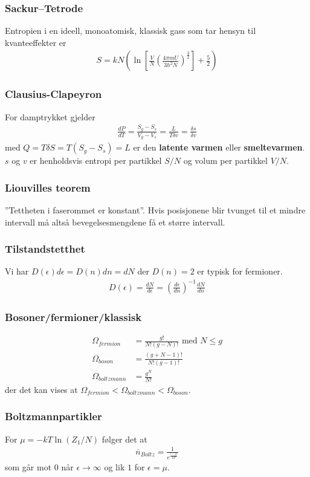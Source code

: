 \documentclass[a4paper, norsk, 10pt]{article}
\newcommand{\EQU}[1] { \begin{equation*} \begin{split}
#1  
\end{split} \end{equation*} }
\begin{document}
\begin{multicols*}{2}
\subsubsection*{Sackur–Tetrode}
Entropien i en ideell, monoatomisk, klassisk gass som tar hensyn til kvanteeffekter er
\EQU{
S = kN \left( \ln \left[ \frac{V}{N} \left(\frac{4 \pi m U}{3h^2 N}\right)^\frac{3}{2} \right] + \frac{5}{2} \right)
}

\subsubsection*{Clausius-Clapeyron}
For damptrykket gjelder
\EQU{
\frac{dP}{dT} = \frac{S_g-S_s}{V_g-V_s} = \frac{L}{T\delta v} = \frac{\delta s}{\delta v}
}
med $Q=T\delta S = T(S_g-S_s) = L$ er den \textbf{latente varmen} eller \textbf{smeltevarmen}. $s$ og $v$ er henholdsvis entropi per partikkel $S/N$ og volum per partikkel $V/N$.


\subsubsection*{Liouvilles teorem}
''Tettheten i faserommet er konstant''. Hvis posisjonene blir tvunget til et mindre intervall må altså bevegelsesmengdene få et større intervall.


\subsubsection*{Tilstandstetthet}
Vi har $D(\epsilon)d\epsilon = D(n)dn = dN$ der $D(n)=2$ er typisk for fermioner. 
\EQU{
D(\epsilon)= \frac{dN}{d\epsilon}=\left(\frac{d\epsilon}{dn}\right)^{-1}\frac{dN}{dn}
}

\subsubsection*{Bosoner/fermioner/klassisk}
\EQU{
\Omega_{fermion} &= \frac{g!}{N!(g-N)!} \text{ med } N\leq g \\
\Omega_{boson} &= \frac{(g+N-1)!}{N!(g-1)!} \\
\Omega_{boltzmann} &= \frac{g^N}{N!} 
}
der det kan vises at $\Omega_{fermion}<\Omega_{boltzmann}<\Omega_{boson}$.

\subsubsection*{Boltzmannpartikler}
For $\mu = -kT \ln (Z_1/N)$ følger det at 
\EQU{
\overline{n}_{Boltz} = \frac{1}{e^{\frac{\epsilon-\mu}{kT}}}
}
som går mot $0$ når $\epsilon \rightarrow \infty$ og lik $1$ for $\epsilon = \mu$.


\end{multicols*}
\end{document}
